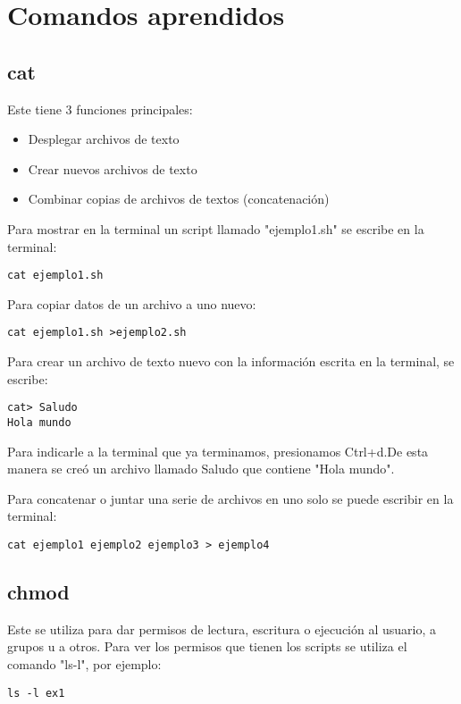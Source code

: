 \documentclass[a4paper]{article}
\begin{document}
\section{Comandos aprendidos}
\subsection{cat}
Este tiene 3 funciones principales:
\begin{itemize}

\item Desplegar archivos de texto
\item Crear nuevos archivos de texto
\item Combinar copias de archivos de textos (concatenación)

\end{itemize} 


Para mostrar en la terminal un script llamado "ejemplo1.sh" se escribe en la terminal:
\begin{verbatim}
cat ejemplo1.sh
\end{verbatim}

Para copiar datos de un archivo a uno nuevo:

\begin{verbatim}
cat ejemplo1.sh >ejemplo2.sh
\end{verbatim}

Para crear un archivo de texto nuevo con la información escrita en la terminal, se escribe:

\begin{verbatim}
cat> Saludo
Hola mundo
\end{verbatim}

Para indicarle a la terminal que ya terminamos, presionamos Ctrl+d.De esta manera se creó un archivo llamado Saludo que contiene "Hola mundo". 


Para concatenar o juntar una serie de archivos en uno solo se puede escribir en la terminal:

\begin{verbatim}
cat ejemplo1 ejemplo2 ejemplo3 > ejemplo4 
\end{verbatim}

\subsection{chmod}

Este se utiliza para dar permisos de lectura, escritura o ejecución al usuario, a grupos u a otros. 
Para ver los permisos que tienen los scripts se utiliza el comando "ls-l", por ejemplo:
\begin{verbatim}
ls -l ex1
\end{verbatim}
\end{document}
